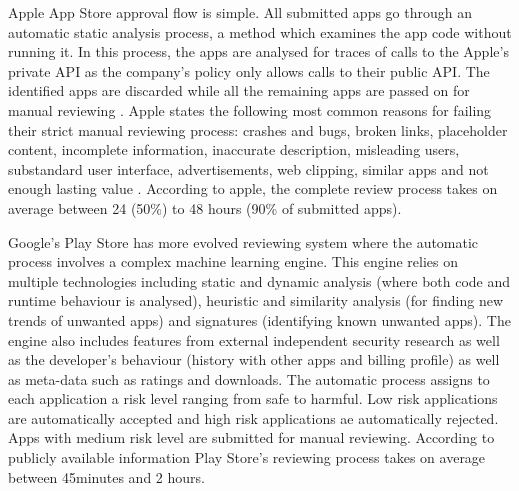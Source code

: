 Apple App Store approval flow is simple. All submitted apps go through an automatic static analysis process, a method which examines the app code without running it. In this process, the apps are analysed for traces of calls to the Apple's private API as the company's policy only allows calls to their public API. The identified apps are discarded while all the remaining apps are passed on for manual reviewing \cite{AppleInsiderWebsite}\cite{AppleApprovalFortune}. Apple states the following most common reasons for failing their strict manual reviewing process: crashes and bugs, broken links, placeholder content, incomplete information, inaccurate description, misleading users, substandard user interface, advertisements, web clipping, similar apps and not enough lasting value \cite{AppleReviewRejections}. According to apple, the complete review process takes on average between 24 (50\%) to 48 hours (90\% of submitted apps)\cite{AppleReviewTime}. 

Google's Play Store has more evolved reviewing system where the automatic process involves a complex machine learning engine. This engine relies on multiple technologies including static and dynamic analysis (where both code and runtime behaviour is analysed), heuristic and similarity analysis (for finding new trends of unwanted apps) and signatures (identifying known unwanted apps). The engine also includes features from external independent security research as well as the developer's behaviour (history with other apps and billing profile) as well as meta-data such as ratings and downloads. The automatic process assigns to each application a risk level ranging from safe to harmful. Low risk applications are automatically accepted and high risk applications ae automatically rejected. Apps with medium risk level are submitted for manual reviewing\cite{AndroidWhitePaper}. According to publicly available information Play Store's reviewing process takes on average between 45minutes and 2 hours\cite{AndroidReviewTime}.

